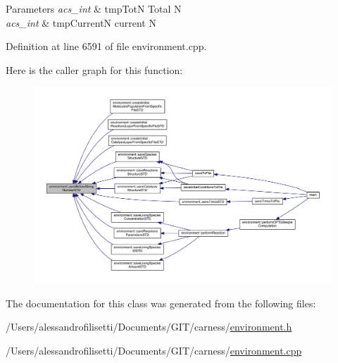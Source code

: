 \begin{DoxyParams}{Parameters}
{\em acs\-\_\-int} & tmp\-Tot\-N Total N \\
\hline
{\em acs\-\_\-int} & tmp\-Current\-N current N \\
\hline
\end{DoxyParams}


Definition at line 6591 of file environment.\-cpp.



Here is the caller graph for this function\-:\nopagebreak
\begin{figure}[H]
\begin{center}
\leavevmode
\includegraphics[width=350pt]{a00014_a8699a0f85f5e8dc23eb8f78fa22c6b17_icgraph}
\end{center}
\end{figure}




The documentation for this class was generated from the following files\-:\begin{DoxyCompactItemize}
\item 
/\-Users/alessandrofilisetti/\-Documents/\-G\-I\-T/carness/\hyperlink{a00086}{environment.\-h}\item 
/\-Users/alessandrofilisetti/\-Documents/\-G\-I\-T/carness/\hyperlink{a00085}{environment.\-cpp}\end{DoxyCompactItemize}
